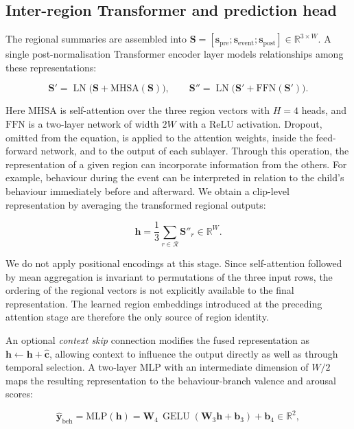 \documentclass[11pt]{article}
\newcommand{\R}{\mathbb{R}}
\newcommand{\regions}{\mathcal{R}}
\newcommand{\vchat}{\hat{\mathbf{c}}}
\newcommand{\vs}{\mathbf{s}}
\newcommand{\vh}{\mathbf{h}}
\newcommand{\vy}{\hat{\mathbf{y}}}
\newcommand{\vb}{\mathbf{b}}
\newcommand{\mS}{\mathbf{S}}
\newcommand{\mW}{\mathbf{W}}
\newcommand{\GELU}{\operatorname{GELU}}
\newcommand{\LN}{\operatorname{LN}}
\begin{document}
\subsection{Inter-region Transformer and prediction head}
\label{sec:region-transformer}

The regional summaries are assembled into $\mS=[\vs_{\text{pre}};\vs_{\text{event}};\vs_{\text{post}}]\in\R^{3\times W}$. A single post-normalisation Transformer encoder layer models relationships among these representations:

\begin{equation}
  \mS' = \LN\big(\mS + \mathrm{MHSA}(\mS)\big),
  \qquad
  \mS'' = \LN\big(\mS' + \mathrm{FFN}(\mS')\big).
\end{equation}

Here $\mathrm{MHSA}$ is self-attention over the three region vectors with $H=4$ heads, and $\mathrm{FFN}$ is a two-layer network of width $2W$ with a ReLU activation. Dropout, omitted from the equation, is applied to the attention weights, inside the feed-forward network, and to the output of each sublayer. Through this operation, the representation of a given region can incorporate information from the others. For example, behaviour during the event can be interpreted in relation to the child's behaviour immediately before and afterward. We obtain a clip-level representation by averaging the transformed regional outputs:

\begin{equation}
  \vh = \frac{1}{3}\sum_{r\in\regions}\mS''_r\in\R^{W}.
\end{equation}

We do not apply positional encodings at this stage. Since self-attention followed by mean aggregation is invariant to permutations of the three input rows, the ordering of the regional vectors is not explicitly available to the final representation. The learned region embeddings introduced at the preceding attention stage are therefore the only source of region identity.

An optional \emph{context skip} connection modifies the fused representation as $\vh\leftarrow\vh+\vchat$, allowing context to influence the output directly as well as through temporal selection. A two-layer MLP with an intermediate dimension of $W/2$ maps the resulting representation to the behaviour-branch valence and arousal scores:

\begin{equation}
  \vy_{\text{beh}} = \mathrm{MLP}(\vh) = \mW_4\,\GELU(\mW_3\vh+\vb_3)+\vb_4\in\R^{2},
\end{equation}
\end{document}
